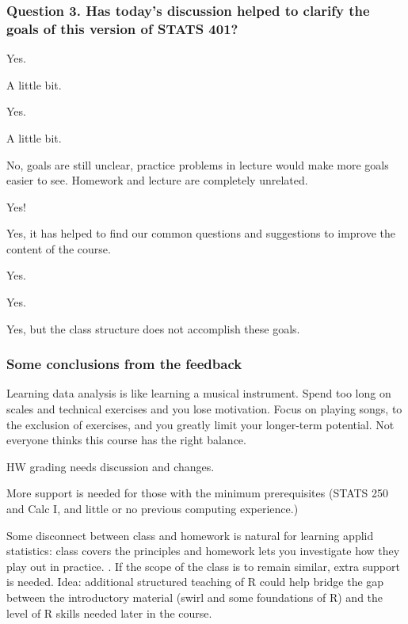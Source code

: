 \documentclass{beamer}
\begin{document}
\begin{frame}
  \frametitle{Question 3. Has today's discussion helped to clarify the goals of this version of STATS 401?}
  \begin{myitemize}
  \item Yes.
  \item A little bit.
  \item Yes.
  \item A little bit.
  \item No, goals are still unclear, practice problems in lecture would make more goals easier to see. Homework and lecture are completely unrelated.
  \item Yes!
  \item Yes, it has helped to find our common questions and suggestions to improve the content of the course.
  \item Yes.
  \item Yes.
  \item Yes, but the class structure does not accomplish these goals.
  \end{myitemize}
\end{frame}

\begin{frame}
  \frametitle{Some conclusions from the feedback}
  \begin{myitemize}
    \item Learning data analysis is like learning a musical instrument. Spend too long on scales and technical exercises and you lose motivation. Focus on playing songs, to the exclusion of exercises, and you greatly limit your longer-term potential. Not everyone thinks this course has the right balance. 
    \item HW grading needs discussion and changes.
    \item More support is needed for those with the minimum prerequisites (STATS 250 and Calc I, and little or no previous computing experience.)
    \item Some disconnect between class and homework is natural for learning applid statistics: class covers the principles and homework lets you investigate how they play out in practice. . If the scope of the class is to remain similar, extra support is needed. Idea: additional structured teaching of R could help bridge the gap between the introductory material (swirl and some foundations of R) and the level of R skills needed later in the course.
  \end{myitemize}
\end{frame}
\end{document}

